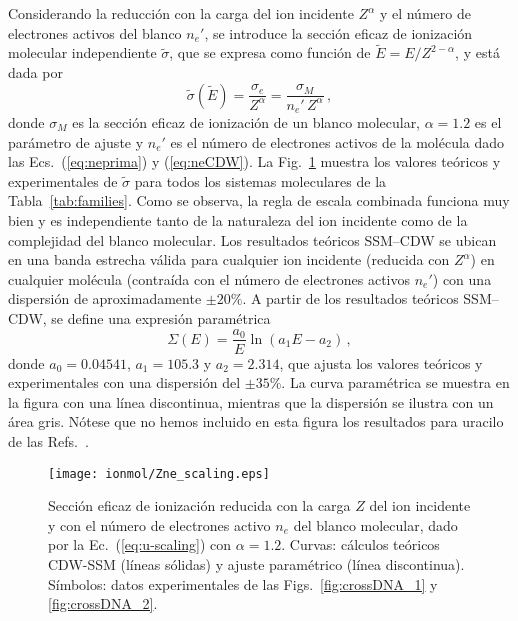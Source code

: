 Considerando la reducción con la carga del ion incidente $Z^\alpha$ y  
el número de electrones activos del blanco $n_e'$, se introduce la 
sección eficaz de ionización molecular independiente $\tilde{\sigma}$, 
que se expresa como función de $\tilde{E}=E/Z^{2-\alpha}$, y está dada 
por 
\begin{equation}
\tilde{\sigma}\left(\tilde{E}\right)=\frac{\sigma_e}{Z^{\alpha}}
=\frac{\sigma_M}{n_e'\,Z^{\alpha}}\,,
\label{eq:u-scaling}
\end{equation}
donde $\sigma_M$ es la sección eficaz de ionización de un blanco 
molecular, $\alpha=1.2$ es el parámetro de ajuste y $n_e'$ es el número 
de electrones activos de la molécula dado las Ecs.~(\ref{eq:neprima}) y 
(\ref{eq:neCDW}). La Fig.~\ref{fig:zalpha} muestra los valores teóricos 
y experimentales de $\tilde{\sigma}$ para todos los sistemas moleculares 
de la Tabla~\ref{tab:families}. Como se observa, la regla de escala 
combinada funciona muy bien y es independiente tanto de la naturaleza 
del ion incidente como de la complejidad del blanco molecular. Los 
resultados teóricos SSM--CDW se ubican en una banda estrecha válida para 
cualquier ion incidente (reducida con $Z^\alpha$) en cualquier molécula 
(contraída con el número de electrones activos $n_e'$) con una 
dispersión de aproximadamente $\pm 20\%$. A partir de los resultados 
teóricos SSM--CDW, se define una expresión paramétrica
\begin{equation}
\Sigma(E)= \frac{a_0}{E} \ln \left( a_1 E - a_2 \right)\,,
\end{equation}
donde $a_0=0.04541$, $a_1=105.3$ y $a_2=2.314$, que ajusta los valores 
teóricos y experimentales con una dispersión del $\pm 35\%$. La curva 
paramétrica se muestra en la figura con una línea discontinua, mientras 
que la dispersión se ilustra con un área gris. Nótese que no hemos 
incluido en esta figura los resultados para uracilo de las 
Refs.~\cite{agnihotri2012,agnihotri2013}. 

\begin{figure}[t]
\centering
\texttt{[image: ionmol/Zne\_scaling.eps]}
\caption[Sección eficaz de ionización reducida por $Z$ y $n_e$.]
{Sección eficaz de ionización reducida con la carga $Z$ del ion 
incidente y con el número de electrones activo $n_e$ del blanco 
molecular, dado por la Ec.~(\ref{eq:u-scaling}) con $\alpha=1.2$. 
Curvas: cálculos teóricos CDW-SSM (líneas sólidas) y ajuste paramétrico 
(línea discontinua). Símbolos: datos experimentales de las 
Figs.~\ref{fig:crossDNA_1} y \ref{fig:crossDNA_2}.}
\label{fig:zalpha}
\end{figure} 

